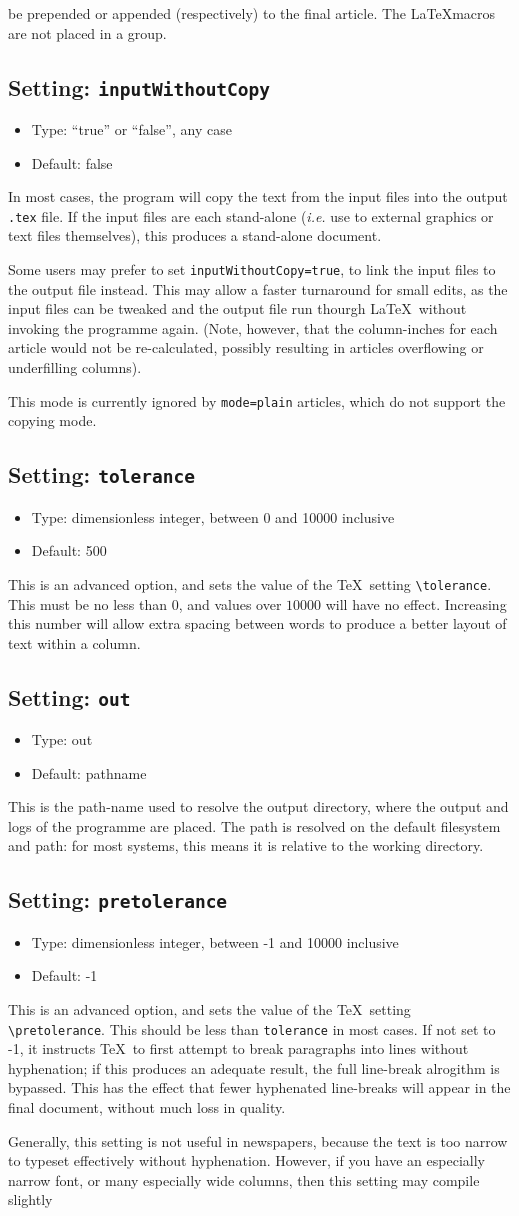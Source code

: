 \documentclass[a4paper,DIV=11]{scrartcl}
\newcommand{\property}[5]{
  \subsection{#1: \texttt{#2}}
  \begin{itemize}
  \item Type: #3
  \item Default: #4
  \end{itemize}
  #5
}
\newcommand{\setting}{\property{Setting}}
\begin{document}
\begin{multicols}{2}
{  be prepended or appended (respectively) to the final article. The
  \LaTeX macros are not placed in a group.
}
\setting{inputWithoutCopy}{``true'' or ``false'', any case}{false}{
  In most cases, the program will copy the text from the input files
  into the output \texttt{.tex} file. If the input files are each
  stand-alone (\textit{i.e.} use to external graphics or text files
  themselves), this produces a stand-alone document. \par
  Some users may prefer to set \texttt{inputWithoutCopy=true}, to link
  the input files to the output file instead. This may allow a faster
  turnaround for small edits, as the input files can be tweaked and
  the output file run thourgh \LaTeX\ without invoking the programme
  again. (Note, however, that the column-inches for each article would
  not be re-calculated, possibly resulting in articles overflowing or
  underfilling columns).\par
  This mode is currently ignored by \texttt{mode=plain} articles,
  which do not support the copying mode.
}
\setting{tolerance}{dimensionless integer, between 0 and 10000 inclusive}{500}{
  This is an advanced option, and sets the value of the \TeX\ setting
  \texttt{\textbackslash tolerance}. This must be no less than $0$,
  and values over $10000$ will have no effect. Increasing this number
  will allow extra spacing between words to produce a better layout of
  text within a column.}  \setting{out}{out}{pathname}{This is the
  path-name used to resolve the output directory, where the output and
  logs of the programme are placed. The path is resolved on the
  default filesystem and path: for most systems, this means it is
  relative to the working directory.}
\setting{pretolerance}{dimensionless integer, between -1 and 10000 inclusive}{-1}{
  This is an advanced option, and sets the value of the \TeX\ setting
  \texttt{\textbackslash pretolerance}. This should be less than
  \texttt{tolerance} in most cases. If not set to -1, it instructs
  \TeX\ to first attempt to break paragraphs into lines without
  hyphenation; if this produces an adequate result, the full
  line-break alrogithm is bypassed. This has the effect that fewer
  hyphenated line-breaks will appear in the final document, without
  much loss in quality.\par
  Generally, this setting is not useful in newspapers, because the
  text is too narrow to typeset effectively without
  hyphenation. However, if you have an especially narrow font, or many
  especially wide columns, then this setting may compile slightly
}
\end{multicols}
\end{document}
